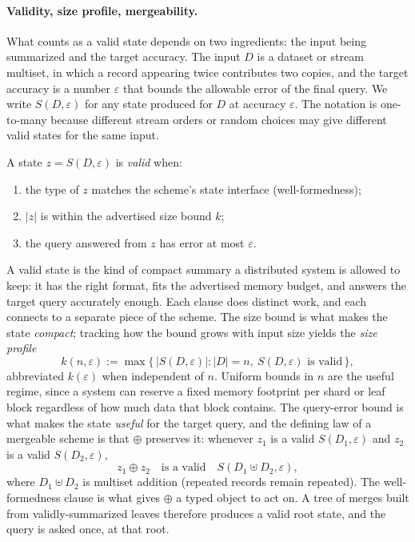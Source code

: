 \paragraph{Validity, size profile, mergeability.}
What counts as a valid state depends on two ingredients: the input being
summarized and the target accuracy. The input \(D\) is a dataset or
stream multiset, in which a record appearing twice contributes two
copies, and the target accuracy is a number \(\varepsilon\) that bounds
the allowable error of the final query. We write \(S(D,\varepsilon)\)
for any state produced for \(D\) at accuracy \(\varepsilon\). The
notation is one-to-many because different stream orders or random
choices may give different valid states for the same input.

\begin{definition}
\label{def:v7-valid-state}
A state \(z=S(D,\varepsilon)\) is \emph{valid} when:
\begin{enumerate}[leftmargin=1.5em,nosep]
\item the type of \(z\) matches the scheme's state interface
(well-formedness);
\item \(|z|\) is within the advertised size bound \(k\);
\item the query answered from \(z\) has error at most \(\varepsilon\).
\end{enumerate}
\end{definition}

A valid state is the kind of compact summary a distributed system is
allowed to keep: it has the right format, fits the advertised memory
budget, and answers the target query accurately enough. Each clause
does distinct work, and each connects to a separate piece of the
scheme. The size bound is what makes the state \emph{compact};
tracking how the bound grows with input size yields the \emph{size
profile}
\[
  k(n,\varepsilon)
  :=
  \max\{\,|S(D,\varepsilon)| : |D|=n,\ S(D,\varepsilon)
    \text{ is valid}\,\},
\]
abbreviated \(k(\varepsilon)\) when independent of \(n\). Uniform
bounds in \(n\) are the useful regime, since a system can reserve a
fixed memory footprint per shard or leaf block regardless of how much
data that block contains. The query-error bound is what makes the state
\emph{useful}
for the target query, and the defining law of a mergeable scheme is
that \(\oplus\) preserves it: whenever \(z_1\) is a valid
\(S(D_1,\varepsilon)\) and \(z_2\) is a valid \(S(D_2,\varepsilon)\),
\[
  z_1 \oplus z_2 \quad\text{is a valid}\quad
  S(D_1\uplus D_2,\varepsilon),
\]
where \(D_1\uplus D_2\) is multiset addition (repeated records remain
repeated). The well-formedness clause is what gives \(\oplus\) a typed
object to act on. A tree of merges built from validly-summarized leaves
therefore produces a valid root state, and the query is asked once, at
that root.

